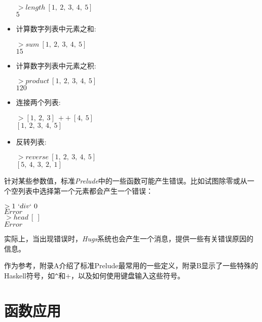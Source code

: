 \begin{itemize}
\noindent\hspace*{1cm} $> length~[1,~2,~3,~4,~5]$\\
\hspace*{1cm} $5$

\item 计算数字列表中元素之和:

\noindent\hspace*{1cm} $> sum~[1,~2,~3,~4,~5]$\\
\hspace*{1cm} $15$

\item 计算数字列表中元素之积:

\noindent\hspace*{1cm} $> product~[1,~2,~3,~4,~5]$\\
\hspace*{1cm} $120$

\item 连接两个列表:

\noindent\hspace*{1cm} $> [1,~2,~3]~++~[4,~5]$\\
\hspace*{1cm} $[1,~2,~3,~4,~5]$

\item 反转列表:

\noindent\hspace*{1cm} $> reverse~[1,~2,~3,~4,~5]$\\
\hspace*{1cm} $[5,~4,~3,~2,~1]$

\end{itemize}

针对某些参数值，标准\textit{Prelude}中的一些函数可能产生错误。比如试图除零或从一个空列表中选择第一个元素都会产生一个错误：

\noindent\hspace*{1cm} $> 1~`div`~0$\\
\hspace*{1cm} $Error$\\
\hspace*{1cm} $> head~[~]$\\
\hspace*{1cm} $Error$

实际上，当出现错误时，\textit{Hugs}系统也会产生一个消息，提供一些有关错误原因的信息。

作为参考，附录A介绍了标准Prelude最常用的一些定义，附录B显示了一些特殊的Haskell符号，如\verb|^|和$+$，以及如何使用键盘输入这些符号。

\section{函数应用}

